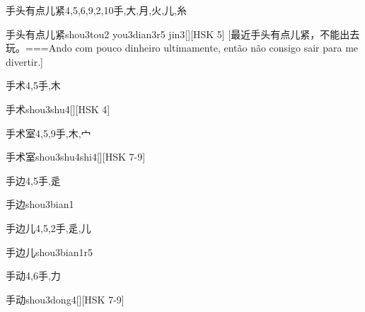 \begin{Entry}{手头有点儿紧}{4,5,6,9,2,10}{⼿,⼤,⽉,⽕,⼉,⽷}
  \begin{Phonetics}{手头有点儿紧}{shou3tou2 you3dian3r5 jin3}[][HSK 5]
    [最近手头有点儿紧，不能出去玩。===Ando com pouco dinheiro ultimamente, então não consigo sair para me divertir.]
  \end{Phonetics}
\end{Entry}

\begin{Entry}{手术}{4,5}{⼿,⽊}
  \begin{Phonetics}{手术}{shou3shu4}[][HSK 4]
  \end{Phonetics}
\end{Entry}

\begin{Entry}{手术室}{4,5,9}{⼿,⽊,⼧}
  \begin{Phonetics}{手术室}{shou3shu4shi4}[][HSK 7-9]
  \end{Phonetics}
\end{Entry}

\begin{Entry}{手边}{4,5}{⼿,⾡}
  \begin{Phonetics}{手边}{shou3bian1}
  \end{Phonetics}
\end{Entry}

\begin{Entry}{手边儿}{4,5,2}{⼿,⾡,⼉}
  \begin{Phonetics}{手边儿}{shou3bian1r5}
  \end{Phonetics}
\end{Entry}

\begin{Entry}{手动}{4,6}{⼿,⼒}
  \begin{Phonetics}{手动}{shou3dong4}[][HSK 7-9]
  \end{Phonetics}
\end{Entry}

